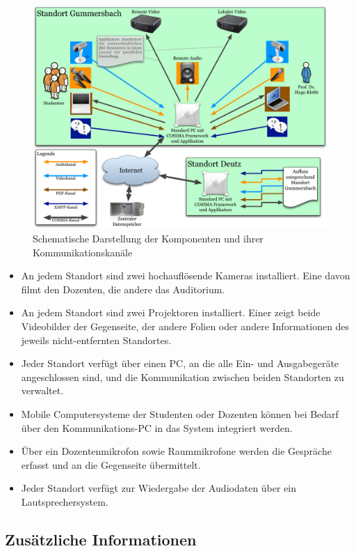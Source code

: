   \begin{figure}[ht]
    \centering
      \includegraphics[width=.9\textwidth]{images/Hardware_und_Kanaele.pdf}
    \caption{Schematische Darstellung der Komponenten und ihrer Kommunikationskanäle}
    \label{fig:images_Hardware_und_Kanaele}
  \end{figure}
  
  \begin{itemize}
    \item An jedem Standort sind zwei hochauflösende Kameras installiert. Eine davon filmt den Dozenten, die andere das Auditorium.
    \item An jedem Standort sind zwei Projektoren installiert. Einer zeigt beide Videobilder der Gegenseite, der andere Folien oder andere Informationen des jeweils nicht-entfernten Standortes.
    \item Jeder Standort verfügt über einen PC, an die alle Ein- und Ausgabegeräte angeschlossen sind, und die Kommunikation zwischen beiden Standorten zu verwaltet.
    \item Mobile Computersysteme der Studenten oder Dozenten können bei Bedarf über den Kommunikations-PC in das System integriert werden.
    \item Über ein Dozentenmikrofon sowie Raummikrofone werden die Gespräche erfasst und an die Gegenseite übermittelt.
    \item Jeder Standort verfügt zur Wiedergabe der Audiodaten über ein Lautsprechersystem.
  \end{itemize}
  
\subsection{Zusätzliche Informationen} %
\label{sub:zusaetzliche_informationen}

